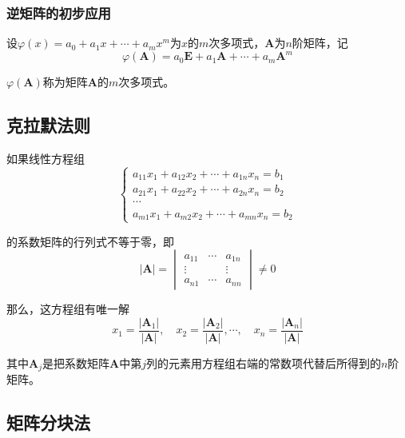 \documentclass[12pt, a4paper, oneside]{ctexart}
\begin{document}
\subsubsection{逆矩阵的初步应用}

设$\varphi (x)=a_0+a_1 x+\cdots+a_m x^m$为$x$的$m$次多项式，$\mathbf{A}$为$n$阶矩阵，记
\begin{equation*}
  \varphi(\mathbf{A})=a_0 \mathbf{E}+a_1 \mathbf{A}+\cdots +a_m \mathbf{A}^m
\end{equation*}

$\varphi(\mathbf{A})$称为矩阵$\mathbf{A}$的$m$次多项式。

\subsection{克拉默法则}

如果线性方程组
\begin{equation*}
  \left\{\begin{matrix}
    a_{11}x_1+a_{12}x_2+\cdots +a_{1n}x_n=b_1 \\
    a_{21}x_1+a_{22}x_2+\cdots +a_{2n}x_n=b_2 \\
    \cdots \\
    a_{m1}x_1+a_{m2}x_2+\cdots +a_{mn}x_n=b_2
   \end{matrix}\right.
\end{equation*}

的系数矩阵的行列式不等于零，即
\begin{equation*}
  |\mathbf{A}|=\begin{vmatrix}
    a_{11} & \cdots & a_{1n} \\
    \vdots & & \vdots \\
    a_{n1} & \cdots & a_{nn}
  \end{vmatrix}\neq 0
\end{equation*}

那么，这方程组有唯一解
\begin{equation*}
  x_1=\frac{|\mathbf{A}_1|}{|\mathbf{A}|},\quad x_2=\frac{|\mathbf{A}_2|}{|\mathbf{A}|},\cdots, \quad x_n=\frac{|\mathbf{A}_n|}{|\mathbf{A}|}
\end{equation*}

其中$\mathbf{A}_j$是把系数矩阵$\mathbf{A}$中第$j$列的元素用方程组右端的常数项代替后所得到的$n$阶矩阵。

\subsection{矩阵分块法}
\end{document}
